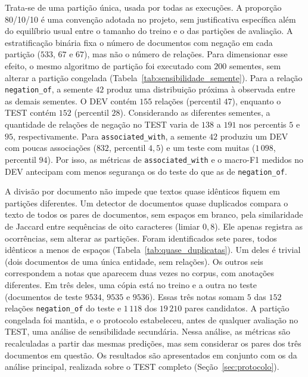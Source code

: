 Trata-se de uma partição única, usada por todas as execuções. A proporção 80/10/10
é uma convenção adotada no projeto, sem justificativa específica além do equilíbrio
usual entre o tamanho do treino e o das partições de avaliação. A estratificação
binária fixa o número de documentos com negação em cada partição ($533$, $67$ e
$67$), mas não o número de relações. Para dimensionar esse efeito, o mesmo
algoritmo de partição foi executado com $200$ sementes, sem alterar a partição
congelada (Tabela~\ref{tab:sensibilidade_semente}). Para a relação \texttt{negation\_of}, a semente $42$ produz uma distribuição próxima à observada entre as demais sementes. O DEV contém $155$ relações (percentil $47$), enquanto o TEST contém $152$ (percentil $28$). Considerando as diferentes sementes, a quantidade de relações de negação no TEST varia de $138$ a $191$ nos percentis $5$ e $95$, respectivamente. Para \texttt{associated\_with}, a semente $42$
produziu um DEV com poucas associações ($832$, percentil $4{,}5$) e um teste com
muitas ($1\,098$, percentil $94$). Por isso, as métricas de
\texttt{associated\_with} e o macro-F1 medidos no DEV antecipam com menos
segurança os do teste do que as de \texttt{negation\_of}.



A divisão por documento não impede que textos quase idênticos fiquem em partições
diferentes. Um detector de documentos quase duplicados compara o texto de todos os
pares de documentos, sem espaços em branco, pela similaridade de Jaccard entre
sequências de oito caracteres (limiar $0{,}8$). Ele apenas registra as ocorrências,
sem alterar as partições. Foram identificados sete pares, todos idênticos a menos de
espaços (Tabela~\ref{tab:quase_duplicatas}). Um deles é trivial (dois documentos de
uma única entidade, sem relações). Os outros seis correspondem a notas que aparecem
duas vezes no corpus, com anotações diferentes. Em três deles, uma cópia está no
treino e a outra no teste (documentos de teste $9534$, $9535$ e $9536$). Essas três
notas somam $5$ das $152$ relações \texttt{negation\_of} do teste e $1\,118$ dos
$19\,210$ pares candidatos. A partição congelada foi mantida, e o protocolo estabeleceu, antes de qualquer avaliação no TEST, uma análise de sensibilidade secundária. Nessa análise, as métricas são recalculadas a partir das mesmas predições, mas sem considerar os pares dos três documentos em questão. Os resultados são apresentados em conjunto com os da análise principal, realizada sobre o TEST completo (Seção~\ref{sec:protocolo}).

